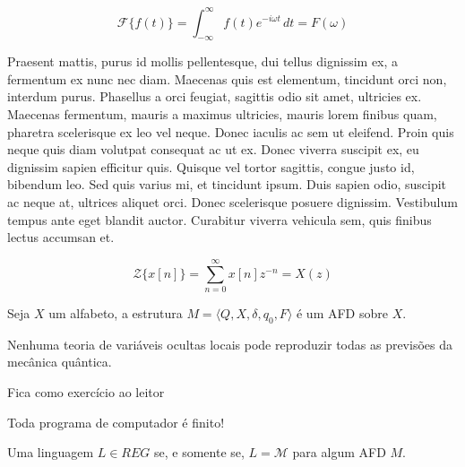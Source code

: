 \begin{equation}
  \mathcal{F}\{f(t)\} = \int_{-\infty}^{\infty} f(t) e^{-i \omega t} \, dt = F(\omega)
\end{equation}

Praesent mattis, purus id mollis pellentesque, dui tellus dignissim ex, a fermentum ex nunc nec diam. Maecenas quis est elementum, tincidunt orci non, interdum purus. Phasellus a orci feugiat, sagittis odio sit amet, ultricies ex. Maecenas fermentum, mauris a maximus ultricies, mauris lorem finibus quam, pharetra scelerisque ex leo vel neque. Donec iaculis ac sem ut eleifend. Proin quis neque quis diam volutpat consequat ac ut ex. Donec viverra suscipit ex, eu dignissim sapien efficitur quis. Quisque vel tortor sagittis, congue justo id, bibendum leo. Sed quis varius mi, et tincidunt ipsum. Duis sapien odio, suscipit ac neque at, ultrices aliquet orci. Donec scelerisque posuere dignissim. Vestibulum tempus ante eget blandit auctor. Curabitur viverra vehicula sem, quis finibus lectus accumsan et.

\begin{equation}
  \mathcal{Z}\{x[n]\} = \sum_{n=0}^{\infty} x[n] z^{-n} = X(z)
\end{equation}

\begin{definicao}
  Seja $X$ um alfabeto, a estrutura $M = \langle Q, X, \delta, q_0, F \rangle$ é um AFD sobre $X$.
\end{definicao}

\begin{teorema}
  Nenhuma teoria de variáveis ocultas locais pode reproduzir todas as previsões da mecânica quântica.
\end{teorema}

\begin{prova}
  Fica como exercício ao leitor
\end{prova}

\begin{Intuição}
  Toda programa de computador é finito!
\end{Intuição}

\begin{lema}
  Uma linguagem $L \in REG$ se, e somente se, $L = \mathcal{M}$ para algum AFD $M$.
\end{lema}
